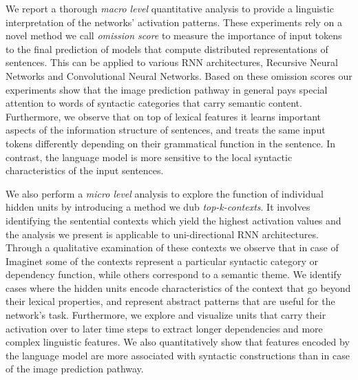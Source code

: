 We report a thorough \emph{macro level} quantitative analysis to
provide a linguistic interpretation of the networks' activation
patterns. These experiments rely on a novel method we
call \emph{omission score} to measure the importance of input tokens 
to the final prediction of models that compute distributed representations 
of sentences. This can be applied to various RNN architectures, Recursive Neural Networks 
and Convolutional Neural Networks.\label{edit:introomissiongeneral}
Based on these omission scores our experiments show that the image prediction 
pathway in general pays special attention to words of syntactic categories that 
carry semantic content. Furthermore, we observe that on top of
lexical features it learns important aspects of the information structure of sentences,
and treats the same input tokens differently depending on their
grammatical function in the sentence. In contrast, the language model
is more sensitive to the local syntactic characteristics of the input
sentences.


We also perform a \emph{micro level} analysis to explore \label{edit:introtopkgeneral}
the function of individual hidden units by introducing a method we dub \emph{top-k-contexts}.
It involves identifying the sentential contexts which yield the 
highest activation values and the analysis we present is applicable 
to uni-directional RNN architectures.
Through a qualitative examination of these contexts we
observe that in case of {\sc Imaginet} some of the contexts represent a particular 
syntactic category or dependency function, while others correspond to a semantic theme. 
We identify cases where the hidden units encode characteristics of 
the context that go beyond their lexical properties, and represent abstract 
patterns that are useful for the network's task. 
Furthermore, we explore and visualize units that carry their
activation over to later time steps to 
extract longer dependencies and more complex linguistic features. 
We also quantitatively show that features encoded by the language model are more associated 
with syntactic constructions than in case of the image prediction pathway.

